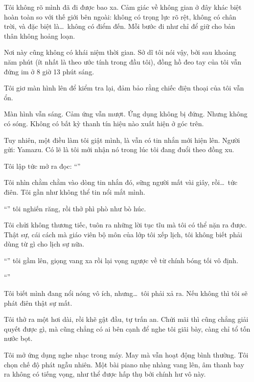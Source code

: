 \documentclass[../main.tex]{subfiles}
\begin{document}
\ct

Tôi không rõ mình đã đi được bao xa. Cảm giác về không gian ở đây khác biệt hoàn toàn so với thế giới bên ngoài: không có trọng lực rõ rệt, không có chân trời, và đặc biệt là\dots\ không có điểm đến. Mỗi bước đi như chỉ để giữ cho bản thân không hoảng loạn.

Nơi này cũng không có khái niệm thời gian. Sở dĩ tôi nói vậy, bởi sau khoảng năm phút (ít nhất là theo ước tính trong đầu tôi), đồng hồ đeo tay của tôi vẫn đứng im ở 8 giờ 13 phút sáng.

Tôi giơ màn hình lên để kiểm tra lại, đảm bảo rằng chiếc điện thoại của tôi vẫn ổn.

Màn hình vẫn sáng. Cảm ứng vẫn mượt. Ứng dụng không bị đứng. Nhưng không có sóng. Không có bất kỳ thanh tín hiệu nào xuất hiện ở góc trên.

Tuy nhiên, một điều làm tôi giật mình, là vẫn có tin nhắn mới hiện lên. Người gửi: Yamazu. Có lẽ là tôi mới nhận nó trong lúc tôi đang đuổi theo đồng xu.

Tôi lập tức mở ra đọc: ``''

Tôi nhìn chằm chằm vào dòng tin nhắn đó, sững người mất vài giây, rồi\dots\ tức điên. Tôi gần như không thể tin nổi mắt mình.

``'' tôi nghiến răng, rồi thở phì phò như bò húc.

Tôi chửi không thương tiếc, tuôn ra những lời tục tĩu mà tôi có thể nặn ra được. Thật sự, cái cách mà giáo viên bộ môn của lớp tôi xếp lịch, tôi không biết phải dùng từ gì cho lịch sự nữa.

``'' tôi gầm lên, giọng vang xa rồi lại vọng ngược về từ chính bóng tối vô định.

``''

Tôi biết mình đang nổi nóng vô ích, nhưng\dots\ tôi phải xả ra. Nếu không thì tôi sẽ phát điên thật sự mất.

Tôi thở ra một hơi dài, rồi khẽ gật đầu, tự trấn an. Chửi mãi thì cũng chẳng giải quyết được gì, mà cũng chẳng có ai bên cạnh để nghe tôi giãi bày, càng chỉ tổ tốn nước bọt.

Tôi mở ứng dụng nghe nhạc trong máy. May mà vẫn hoạt động bình thường. Tôi chọn chế độ phát ngẫu nhiên. Một bài piano nhẹ nhàng vang lên, âm thanh bay ra không có tiếng vọng, như thể được hấp thụ bởi chính hư vô này.
\end{document}
